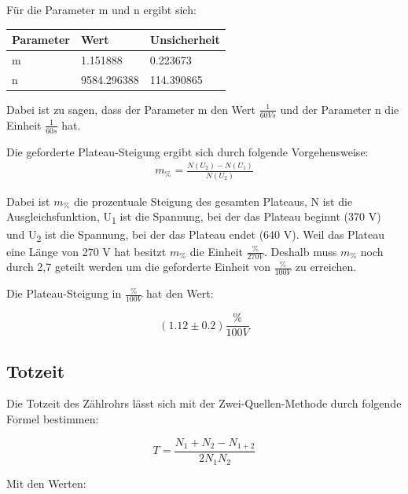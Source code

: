 \noindent Für die Parameter m und n ergibt sich:

\begin{center}
    \begin{tabular}{ll@{${}\pm{}$}l}
        \toprule
        Parameter & Wert & Unsicherheit\\
        \midrule
        m &    1.151888 & 0.223673 \\
        n &   9584.296388 & 114.390865 \\
        \bottomrule
        
    \end{tabular}
\end{center}

\noindent Dabei ist zu sagen, dass der Parameter m den Wert $\frac{1}{60Vs}$ und der Parameter n die Einheit $\frac{1}{60s}$ hat.

\noindent Die geforderte Plateau-Steigung ergibt sich durch folgende Vorgehensweise:
\begin{align}
     m_{\%} = \frac{N(U_2)-N(U_1)}{N(U_2)}
\end{align}

\noindent Dabei ist $m_{\%}$ die prozentuale Steigung des gesamten Plateaus, 
N ist die Ausgleichsfunktion,
U\textsubscript{1} ist die Spannung, bei der das Plateau beginnt (370 V)
und U\textsubscript{2} ist die Spannung, bei der das Plateau endet (640 V).
Weil das Plateau eine Länge von 270 V hat besitzt $m_{\%}$ die Einheit $\frac{\%}{270V}$.
Deshalb muss $m_{\%}$ noch durch 2,7 geteilt werden um die geforderte Einheit von $\frac{\%}{100V}$ zu erreichen.

\noindent Die Plateau-Steigung in $\frac{\%}{100V}$ hat den Wert:

\begin{displaymath}
    (1.12 \pm 0.2) \frac{\%}{100V}
\end{displaymath}


\subsection{Totzeit}

\noindent Die Totzeit des Zählrohrs lässt sich mit der Zwei-Quellen-Methode durch folgende Formel bestimmen:

\begin{displaymath}
    T = \frac{N_1+N_2-N_{1+2}}{2N_1N_2}
\end{displaymath}

\noindent Mit den Werten:

